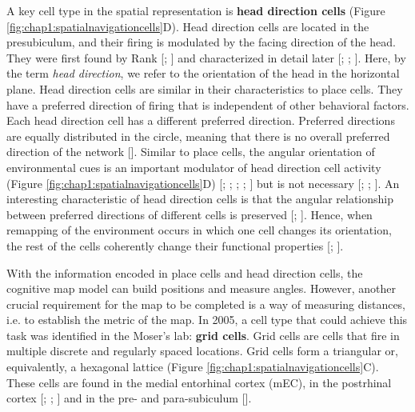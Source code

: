 A key cell type in the spatial representation is \textbf{head direction cells} (Figure \ref{fig:chap1:spatialnavigationcells}D).  
Head direction cells are located in the presubiculum, and their firing is modulated by the facing direction of the head.
They were first found by Rank [\cite{ranck1984}; \cite{ranck1985}] and characterized in detail later [\cite{taube1990a.}; \cite{taube1990b}; \cite{taube1987}].
Here, by the term \textit{head direction}, we refer to the orientation of the head in the horizontal plane.
Head direction cells are similar in their characteristics to place cells. 
They have a preferred direction of firing that is independent of other behavioral factors. 
Each head direction cell has a different preferred direction. 
Preferred directions are equally distributed in the circle, meaning that there is no overall preferred direction of the network [\cite{taube1990b}].
Similar to place cells, the angular orientation of environmental cues is an important modulator of head direction cell activity (Figure \ref{fig:chap1:spatialnavigationcells}D) [\cite{goodridge1995}; \cite{taube1995a}; \cite{taube1990b}; \cite{zugaro2000}; \cite{knierim1995}] but is not necessary [\cite{mizumori1993}; \cite{yoder2011a}; \cite{yoder2011b}].
An interesting characteristic of head direction cells is that the angular relationship between preferred directions of different cells is preserved [\cite{skaggs1995}; \cite{yoganarasimha2005}].
Hence, when remapping of the environment occurs in which one cell changes its orientation, the rest of the cells coherently change their functional properties [\cite{skaggs1995}; \cite{yoganarasimha2005}].

With the information encoded in place cells and head direction cells, the cognitive map model can build positions and measure angles. 
However, another crucial requirement for the map to be completed is a way of measuring distances, i.e. to establish the metric of the map.
In 2005, a cell type that could achieve this task was identified in the Moser's lab: \textbf{grid cells}. 
Grid cells are cells that fire in multiple discrete and regularly spaced locations. 
Grid cells form a triangular or, equivalently, a hexagonal lattice (Figure \ref{fig:chap1:spatialnavigationcells}C). 
These cells are found in the medial entorhinal cortex (mEC), in the postrhinal cortex [\cite{fyhn2004}; \cite{hafting2005}; \cite{fyhn2008}] and in the pre- and para-subiculum [\cite{boccara2010}]. 

